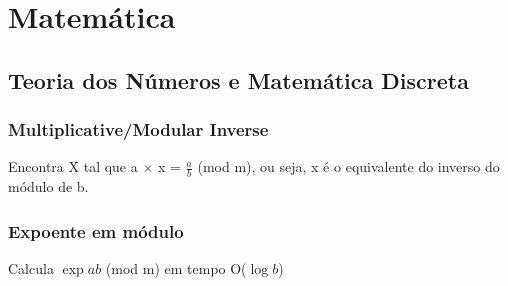 \section{Matemática}

\subsection{Teoria dos Números e Matemática Discreta}


\subsubsection{Multiplicative/Modular Inverse}
Encontra X tal que a $\times$ x = $\frac{a}{b}$ (mod m), ou seja, x é o equivalente do inverso do módulo de b.

\subsubsection{Expoente em módulo}
Calcula $\exp{a}{b}$ (mod m) em tempo O($\log{b}$)
\divisor
